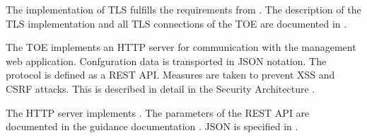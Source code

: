 

The implementation of TLS fulfills the requirements from . The
description of the TLS implementation and all TLS connections of the TOE are
documented in .





The TOE implements an HTTP server for communication with the management web
application. Confguration data is transported in JSON notation. The protocol is
defined as a REST API. Measures are taken to prevent XSS and CSRF attacks. This
is described in detail in the Security Architecture \autocite{adv_arc}.



The HTTP server implements . The parameters of the REST API are
documented in the guidance documentation \autocite{agd_adm}. JSON is specified
in .




